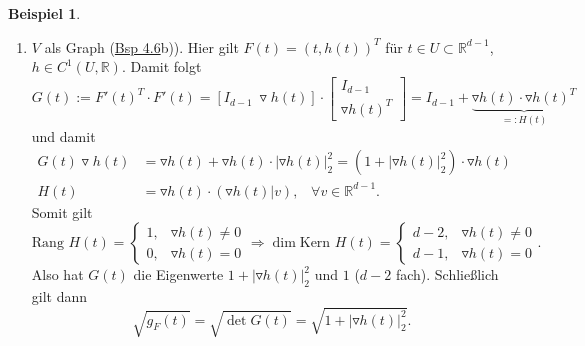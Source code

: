 \documentclass[a4paper]{report}
\newcommand{\R}{\mathbb{R}}
\newcommand{\jlabel}[1]{\label{j_#1}}
\newcommand{\jhyperref}[2]{\hyperref[j_#1]{#2}}
\newcommand{\jlink}[1]{\jhyperref{#1}{#1}}
\theoremstyle{plain}
\theoremstyle{definition}
\newtheorem{expl}[thm]{Beispiel}
\begin{document}
{{{{\begin{expl}
\begin{enumerate}
        \item
            \jlabel{Bsp 4.9b)}
            $V$ als Graph (\jlink{Bsp 4.6}b)). Hier gilt $F(t) = (t, h(t))^T$ für $t\in U \subset \R^{d-1}$, $h\in C^1(U,\R)$. Damit folgt
            \[
                G(t) := F'(t)^T\cdot F'(t) = \left[ I_{d-1} \ \triangledown h(t) \right] \cdot \begin{bmatrix}
                                                                                                    I_{d-1} \\
                                                                                                    \triangledown h(t)^T
                                                                                                \end{bmatrix} = I_{d-1} + \underbrace{\triangledown h(t) \cdot \triangledown h(t)^T}_{=: H(t)}
            \]
            und damit
            \[
                \begin{split}
                G(t)\triangledown h(t) &= \triangledown h(t) + \triangledown h(t)\cdot |\triangledown h(t)|_2^2 = (1 + |\triangledown h(t)|_2^2)\cdot \triangledown h(t)\\
                H(t) &= \triangledown h(t)\cdot (\triangledown h(t)|v), \hspace{10pt} \forall v\in\R^{d-1}.
                \end{split}
            \]
            Somit gilt
            \[
                \text{Rang } H(t) = \begin{cases}
                                       1, & \triangledown h(t) \ne 0 \\
                                       0, & \triangledown h(t) = 0
                                   \end{cases} \Rightarrow \dim \text{Kern } H(t) = \begin{cases}
                                                                                        d-2, & \triangledown h(t) \ne 0\\
                                                                                        d-1, & \triangledown h(t) = 0
                                                                                    \end{cases}.
            \]
            Also hat $G(t)$ die Eigenwerte $1 + |\triangledown h(t)|_2^2$ und $1$ ($d-2$ fach). Schließlich gilt dann
            \[
                \sqrt{g_F(t)} = \sqrt{\det G(t)} = \sqrt{1 + |\triangledown h(t)|_2^2}.
            \]


\end{enumerate}
\end{expl}}}}}
\end{document}
